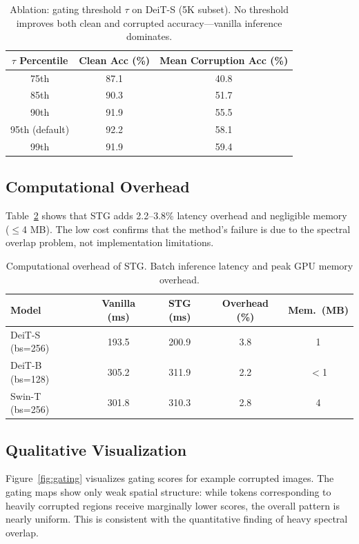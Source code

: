 \documentclass{article}
\newcommand{\methodname}{STG}
\begin{document}
\begin{table}[t]
\centering
\caption{Ablation: gating threshold $\tau$ on DeiT-S (5K subset). No threshold improves both clean and corrupted accuracy---vanilla inference dominates.}
\label{tab:ablation_tau}
\begin{tabular}{ccc}
\toprule
$\tau$ Percentile & Clean Acc (\%) & Mean Corruption Acc (\%) \\
\midrule
75th & 87.1 & 40.8 \\
85th & 90.3 & 51.7 \\
90th & 91.9 & 55.5 \\
95th (default) & 92.2 & 58.1 \\
99th & 91.9 & 59.4 \\
\bottomrule
\end{tabular}
\end{table}

\subsection{Computational Overhead}
\label{sec:overhead}

Table~\ref{tab:overhead} shows that \methodname{} adds 2.2--3.8\% latency overhead and negligible memory ($\leq$4 MB). The low cost confirms that the method's failure is due to the spectral overlap problem, not implementation limitations.

\begin{table}[t]
\centering
\caption{Computational overhead of \methodname{}. Batch inference latency and peak GPU memory overhead.}
\label{tab:overhead}
\begin{tabular}{lcccc}
\toprule
Model & Vanilla (ms) & \methodname{} (ms) & Overhead (\%) & Mem.\ (MB) \\
\midrule
DeiT-S (bs=256) & 193.5 & 200.9 & 3.8 & 1 \\
DeiT-B (bs=128) & 305.2 & 311.9 & 2.2 & $<$1 \\
Swin-T (bs=256) & 301.8 & 310.3 & 2.8 & 4 \\
\bottomrule
\end{tabular}
\end{table}

\subsection{Qualitative Visualization}

Figure~\ref{fig:gating} visualizes gating scores for example corrupted images. The gating maps show only weak spatial structure: while tokens corresponding to heavily corrupted regions receive marginally lower scores, the overall pattern is nearly uniform. This is consistent with the quantitative finding of heavy spectral overlap.
\end{document}
